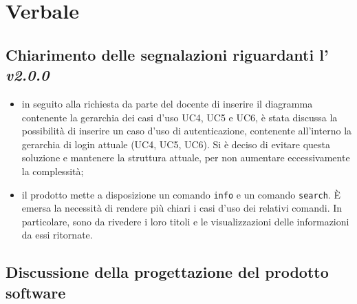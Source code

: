 \section{Verbale}
\subsection{Chiarimento delle segnalazioni riguardanti l'\AdR{} \textit{v2.0.0}}
	\begin{itemize}
		\item in seguito alla richiesta da parte del docente di inserire il diagramma contenente la gerarchia dei casi d'uso UC4, UC5 e UC6, è stata discussa la possibilità di inserire un caso d’uso di autenticazione, contenente all’interno la gerarchia di login attuale (UC4, UC5, UC6). Si è deciso di evitare questa soluzione e mantenere la struttura attuale, per non aumentare eccessivamente la complessità;

		\item il prodotto mette a disposizione un comando \texttt{info} e un comando \texttt{search}. È emersa la necessità di rendere più chiari i casi d’uso dei relativi comandi. In particolare, sono da rivedere i loro titoli e le visualizzazioni delle informazioni da essi ritornate.
	\end{itemize}

\subsection{Discussione della progettazione del prodotto software}
